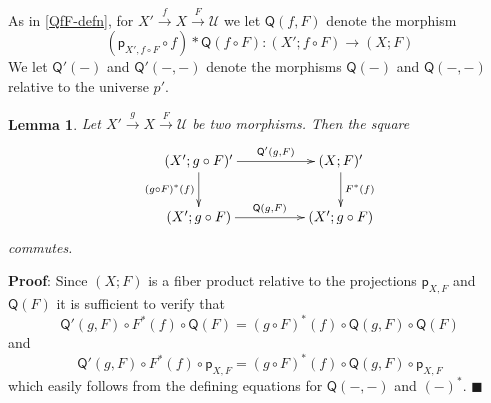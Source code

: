 \documentclass[12pt]{article}
\numberwithin{equation}{section}
\newenvironment{myproof}{{\bf Proof}:}{$\blacksquare$ \vskip 5mm }
\newtheorem{lemma}[proposition]{Lemma}
\newcommand{\sr}{\rightarrow}
\newcommand{\p}{\mathsf{p}}
\newcommand{\U}{\mathcal{U}}
\newcommand{\Q}{\mathsf{Q}}
\begin{document}
As in \ref{QfF-defn}, for $X'\stackrel{f}{\sr}X \stackrel{F}{\sr}\U$ we let $\Q(f,F)$ denote the
morphism
%
$$(\p_{X',f\circ F}\circ f)*\Q(f\circ F):(X';f\circ F)\sr (X;F)$$
%
We let $\Q'(-)$ and $\Q'(-,-)$ denote the morphisms $\Q(-)$ and $\Q(-,-)$ relative
to the universe $p'$.
%
\begin{lemma}
\label{2015.04.20.l1} Let $X'\stackrel{g}{\sr}X\stackrel{F}{\sr}\U$ be two
morphisms. Then the square
%
$$
\begin{xy}
          \xymatrix@C=4pc{ (X';g\circ F)' \ar[r]^-{\Q'(g,F)} \ar[d]_{(g\circ
              F)^*(f)} & (X;F)' \ar[d]^{F^*(f)}\\ (X';g\circ F) \ar[r]^{\Q(g,F)}
            & (X';g\circ F) }
\end{xy}
$$
%
commutes.
%
\end{lemma}
%
\begin{myproof}
Since $(X;F)$ is a fiber product relative to the projections $\p_{X,F}$ and
$\Q(F)$ it is sufficient to verify that
%
$$\Q'(g,F)\circ F^*(f)\circ \Q(F)=(g\circ F)^*(f) \circ \Q(g,F)\circ \Q(F)$$
%
and
%
$$\Q'(g,F)\circ F^*(f)\circ \p_{X,F}=(g\circ F)^*(f) \circ \Q(g,F)\circ \p_{X,F}$$
%
which easily follows from the defining equations for $\Q(-,-)$ and $(-)^*$.
\end{myproof}
\end{document}
